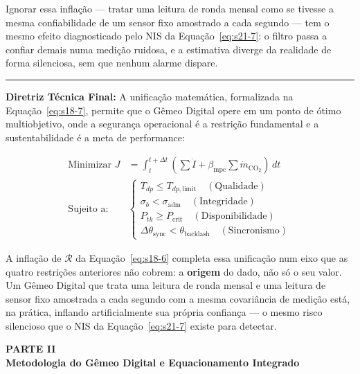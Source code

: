 \documentclass[12pt,a4paper]{article}
\numberwithin{equation}{section}
\numberwithin{table}{section}
\numberwithin{figure}{section}
\begin{document}
Ignorar essa inflação — tratar uma leitura de ronda mensal como se tivesse a mesma confiabilidade de um sensor fixo amostrado a cada segundo — tem o mesmo efeito diagnosticado pelo NIS da Equação~\eqref{eq:s21-7}: o filtro passa a confiar demais numa medição ruidosa, e a estimativa diverge da realidade de forma silenciosa, sem que nenhum alarme dispare.

\vspace{1em}
\hrule
\vspace{1em}

\textbf{Diretriz Técnica Final:} A unificação matemática, formalizada na Equação~\eqref{eq:s18-7}, permite que o Gêmeo Digital opere em um ponto de ótimo multiobjetivo, onde a segurança operacional é a restrição fundamental e a sustentabilidade é a meta de performance:

\begin{equation}\label{eq:s18-7}
\begin{aligned}
	\text{Minimizar } J &= \int_{t}^{t+\Delta t} \left( \sum \dot{I} + \beta_{\text{mpc}} \sum \dot{m}_{\text{CO}_2} \right) \, dt \\[10pt]
	\text{Sujeito a: } & \begin{cases} T_{dp} \le T_{dp,\text{limit}} \quad (\text{Qualidade}) \\ \sigma_{b} < \sigma_{\text{adm}} \quad (\text{Integridade}) \\ P_{tk} \ge P_{\text{crit}} \quad (\text{Disponibilidade}) \\ \Delta \theta_{\text{sync}} < \theta_{\text{backlash}} \quad (\text{Sincronismo}) \end{cases}
\end{aligned}
\end{equation}

A inflação de $\mathcal{R}$ da Equação~\eqref{eq:s18-6} completa essa unificação num eixo que as quatro restrições anteriores não cobrem: a \textbf{origem} do dado, não só o seu valor. Um Gêmeo Digital que trata uma leitura de ronda mensal e uma leitura de sensor fixo amostrada a cada segundo com a mesma covariância de medição está, na prática, inflando artificialmente sua própria confiança — o mesmo risco silencioso que o NIS da Equação~\eqref{eq:s21-7} existe para detectar.

\clearpage
\thispagestyle{empty}
{}
\vspace*{\fill}
\begin{center}
	{\Huge\bfseries PARTE II}\\[2em]
	{\huge\bfseries Metodologia do Gêmeo Digital e Equacionamento Integrado}
\end{center}
\vspace*{\fill}
\clearpage
\end{document}
